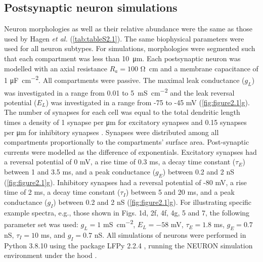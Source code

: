 \subsection{Postsynaptic neuron simulations}
Neuron morphologies as well as their relative abundance were the same as those used by Hagen \textit{et al.} \cite{Hagen2016} (\autoref{tab:tableS2.1}). The same biophysical parameters were used for all neuron subtypes. For simulations, morphologies were segmented such that each compartment was less than \qty{10}{\micro\meter}. Each postsynaptic neuron was modelled with an axial resistance $R_a=100$ \unit{\ohm \centi\meter} and a membrane capacitance of 1 \unit{\micro\farad\per\centi\meter\squared}. All compartments were passive. The maximal leak conductance ($g_L$) was investigated in a range from 0.01 to \qty{5}{\milli\siemens\per\centi\meter\squared} and the leak reversal potential ($E_L$) was investigated in a range from -75 to -45 \unit{\milli\volt} (\autoref{fig:figure2.1}g). The number of synapses for each cell was equal to the total dendritic length times a density of 1 synapse per \unit{\micro\meter} for excitatory synapses and 0.15 synapses per \unit{\micro\meter} for inhibitory synapses \cite{Iacaruso2017, Karimi2020, Palmer2012}. Synapses were distributed among all compartments proportionally to the compartments’ surface area. Post-synaptic currents were modelled as the difference of exponentials. Excitatory synapses had a reversal potential of 0 \unit{\milli\volt}, a rise time of 0.3 ms, a decay time constant ($\tau_E$) between 1 and 3.5 ms, and a peak conductance ($g_E$) between 0.2 and 2 \unit{\nano\siemens} (\autoref{fig:figure2.1}g). Inhibitory synapses had a reversal potential of -80 \unit{\milli\volt}, a rise time of 2 ms, a decay time constant ($\tau_I$) between 5 and 20 ms, and a peak conductance ($g_I$) between 0.2 and 2 \unit{\nano\siemens} (\autoref{fig:figure2.1}g). For illustrating specific example spectra, e.g., those shown in Figs. 1d, 2f, 4f, 4g, 5 and 7, the following parameter set was used: $g_L = 1$ \unit{\milli\siemens\per\centi\meter\squared}, $E_L = -58$ \unit{\milli\volt}, $\tau_E = 1.8$ ms, $g_E = 0.7$ \unit{\nano\siemens}, $\tau_I = 10$ \unit{\milli\second}, and $g_I = 0.7$ \unit{\nano\siemens}. All simulations of neurons were performed in Python 3.8.10 using the package LFPy 2.2.4 \cite{Hagen2018}, running the NEURON simulation environment under the hood \cite{Carnevale2006}.

